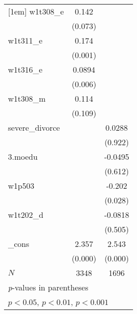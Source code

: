 {\begin{tabular}{l*{2}{c}}
[1em]
w1t308\_e    &       0.142         &                     \\
            &     (0.073)         &                     \\
[1em]
w1t311\_e    &       0.174\sym{***}&                     \\
            &     (0.001)         &                     \\
[1em]
w1t316\_e    &      0.0894\sym{**} &                     \\
            &     (0.006)         &                     \\
[1em]
w1t308\_m    &       0.114         &                     \\
            &     (0.109)         &                     \\
[1em]
severe\_divorce&                     &      0.0288         \\
            &                     &     (0.922)         \\
[1em]
3.moedu     &                     &     -0.0495         \\
            &                     &     (0.612)         \\
[1em]
w1p503      &                     &      -0.202\sym{*}  \\
            &                     &     (0.028)         \\
[1em]
w1t202\_d    &                     &     -0.0818         \\
            &                     &     (0.505)         \\
[1em]
\_cons      &       2.357\sym{***}&       2.543\sym{***}\\
            &     (0.000)         &     (0.000)         \\
\hline
\(N\)       &        3348         &        1696         \\
\hline\hline
\multicolumn{3}{l}{\footnotesize \textit{p}-values in parentheses}\\
\multicolumn{3}{l}{\footnotesize \sym{*} \(p<0.05\), \sym{**} \(p<0.01\), \sym{***} \(p<0.001\)}\\
\end{tabular}
}
